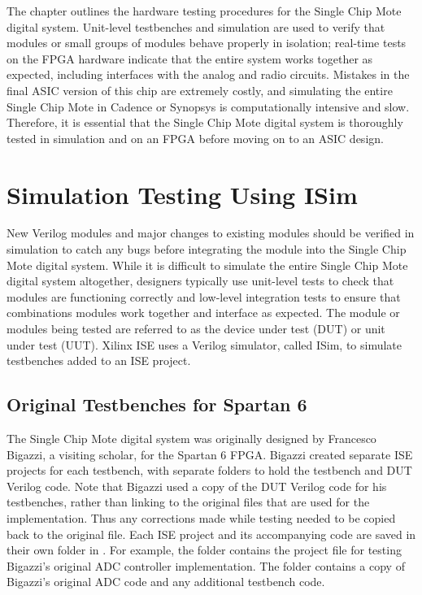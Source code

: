 The chapter outlines the hardware testing procedures for the Single Chip Mote digital system. Unit-level testbenches and simulation are used to verify that modules or small groups of modules behave properly in isolation; real-time tests on the FPGA hardware indicate that the entire system works together as expected, including interfaces with the analog and radio circuits. Mistakes in the final ASIC version of this chip are extremely costly, and simulating the entire Single Chip Mote in Cadence or Synopsys is computationally intensive and slow. Therefore, it is essential that the Single Chip Mote digital system is thoroughly tested in simulation and on an FPGA before moving on to an ASIC design.

\section{Simulation Testing Using ISim}
New Verilog modules and major changes to existing modules should be verified in simulation to catch any bugs before integrating the module into the Single Chip Mote digital system. While it is difficult to simulate the entire Single Chip Mote digital system altogether, designers typically use unit-level tests to check that modules are functioning correctly and low-level integration tests to ensure that combinations modules work together and interface as expected. The module or modules being tested are referred to as the device under test (DUT) or unit under test (UUT). Xilinx ISE uses a Verilog simulator, called ISim, to simulate testbenches added to an ISE project.

\subsection{Original Testbenches for Spartan 6}
The Single Chip Mote digital system was originally designed by Francesco Bigazzi, a visiting scholar, for the Spartan 6 FPGA. Bigazzi created separate ISE projects for each testbench, with separate folders to hold the testbench and DUT Verilog code. Note that Bigazzi used a copy of the DUT Verilog code for his testbenches, rather than linking to the original files that are used for the implementation. Thus any corrections made while testing needed to be copied back to the original file. Each ISE project and its accompanying code are saved in their own folder in . For example, the  folder contains the  project file for testing Bigazzi's original ADC controller implementation. The  folder contains a copy of Bigazzi's original ADC code and any additional testbench code.

